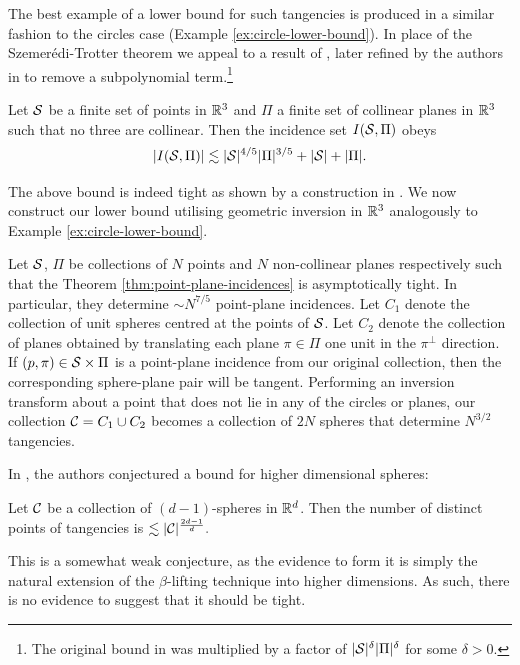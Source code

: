 The best example of a lower bound for such tangencies is produced in a similar fashion to the circles case (Example \ref{ex:circle-lower-bound}). 
In place of the Szemerédi-Trotter theorem we appeal to a result of \cite{Guibas1990}, later refined by the authors in \cite{Sharir2007} to remove a subpolynomial term.\footnote{The original bound in \cite{Guibas1990} was multiplied by a factor of $|\mathcal S|^\delta|\Pi|^\delta$ for some $\delta>0$.}
\begin{theorem}
    Let $\mathcal S$ be a finite set of points in $\mathbb R^3$ and $\Pi$ a finite set of collinear planes in $\mathbb R^3$ such that no three are collinear. \label{thm:point-plane-incidences}
    Then the incidence set $I(\mathcal S, \Pi)$ obeys
    \[
        |I(\mathcal S, \Pi)| \lesssim |\mathcal S|^{4/5}|\Pi|^{3/5} + |\mathcal S| + |\Pi|.
    \] 
\end{theorem}
The above bound is indeed tight as shown by a construction in \cite{Knauer2003}.
We now construct our lower bound utilising geometric inversion in $\mathbb R^3$ analogously to Example \ref{ex:circle-lower-bound}.

\begin{example}
    Let $\mathcal S$, $\Pi$ be collections of $N$ points and $N$ non-collinear planes respectively such that the Theorem \ref{thm:point-plane-incidences} is asymptotically tight. 
    In particular, they determine $\sim N^{7/5}$ point-plane incidences. 
    Let $C_1$ denote the collection of unit spheres centred at the points of $\mathcal S$. 
    Let $C_2$ denote the collection of planes obtained by translating each plane $\pi \in \Pi$ one unit in the $\pi^{\perp}$ direction.
    If $(p,\pi) \in \mathcal S \times \Pi$ is a point-plane incidence from our original collection, then the corresponding sphere-plane pair will be tangent.
    Performing an inversion transform about a point that does not lie in any of the circles or planes, our collection $\mathcal C = C_1 \cup C_2$ becomes a 
    collection of $2N$ spheres that determine $N^{3/2}$ tangencies.
 \end{example}

 In \cite{ellenberg2016new}, the authors conjectured a bound for higher dimensional spheres:
 \begin{conjecture}
     Let $\mathcal C$ be a collection of $(d-1)$-spheres in $\mathbb R^d$. Then the number of distinct points of tangencies is $\lesssim |\mathcal C|^{\frac{2d-1}{d}}.$
 \end{conjecture}

This is a somewhat weak conjecture, as the evidence to form it is simply the natural extension of the $\beta$-lifting technique into higher dimensions. 
As such, there is no evidence to suggest that it should be tight. 
